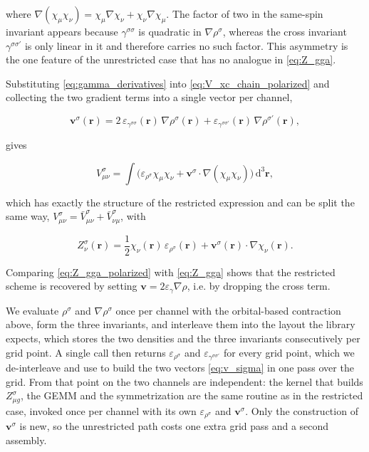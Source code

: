 \documentclass{article}
\begin{document}
where \( \nabla(\chi_\mu \chi_\nu) = \chi_\mu \nabla\chi_\nu + \chi_\nu
\nabla\chi_\mu \). The factor of two in the same-spin invariant appears
because \( \gamma^{\sigma \sigma} \) is quadratic in
\( \nabla \rho^\sigma \), whereas the cross invariant
\( \gamma^{\sigma \sigma'} \) is only linear in it and therefore carries
no such factor. This asymmetry is the one feature of the unrestricted
case that has no analogue in \eqref{eq:Z_gga}.

Substituting \eqref{eq:gamma_derivatives} into
\eqref{eq:V_xc_chain_polarized} and collecting the two gradient terms
into a single vector per channel,

\begin{equation}
  \mathbf v^\sigma(\mathbf r) = 2\, \varepsilon_{\gamma^{\sigma
  \sigma}}(\mathbf r)\, \nabla\rho^\sigma(\mathbf r)
  + \varepsilon_{\gamma^{\sigma \sigma'}}(\mathbf r)\,
  \nabla\rho^{\sigma'}(\mathbf r),
  \label{eq:v_sigma}
\end{equation}

gives

\begin{equation}
  V^{\sigma}_{\mu \nu} = \int \Big( \varepsilon_{\rho^\sigma}
    \chi_\mu \chi_\nu + \mathbf v^\sigma \cdot
  \nabla(\chi_\mu \chi_\nu) \Big)\, \mathrm d^3 \mathbf r,
\end{equation}

which has exactly the structure of the restricted expression and can be
split the same way, \( V^{\sigma}_{\mu \nu} = \bar{V}^{\sigma}_{\mu
\nu} + \bar V^{\sigma}_{\nu \mu} \), with

\begin{equation}
  Z^\sigma_\nu(\mathbf r) = \frac{1}{2} \chi_\nu(\mathbf r)\,
  \varepsilon_{\rho^\sigma}(\mathbf r) + \mathbf v^\sigma(\mathbf r)
  \cdot \nabla \chi_\nu(\mathbf r).
  \label{eq:Z_gga_polarized}
\end{equation}

Comparing \eqref{eq:Z_gga_polarized} with \eqref{eq:Z_gga} shows that
the restricted scheme is recovered by setting \( \mathbf v = 2
\varepsilon_\gamma \nabla\rho \), i.e. by dropping the cross term.

We evaluate \( \rho^\sigma \) and
\( \nabla\rho^\sigma \) once per channel with the orbital-based
contraction above, form the three invariants, and interleave them into
the layout the library expects, which stores the two densities and the
three invariants consecutively per grid point. A single call then
returns \( \varepsilon_{\rho^\sigma} \) and
\( \varepsilon_{\gamma^{\sigma \sigma'}} \) for every grid point, which
we de-interleave and use to build the two vectors
\eqref{eq:v_sigma} in one pass over the grid. From that point on the
two channels are independent: the kernel that builds \( Z^\sigma_{\mu g}
\), the GEMM and the symmetrization are the same routine as in the
restricted case, invoked once per channel with its own
\( \varepsilon_{\rho^\sigma} \) and \( \mathbf v^\sigma \). Only the
construction of \( \mathbf v^\sigma \) is new, so the unrestricted path
costs one extra grid pass and a second assembly.
\end{document}
